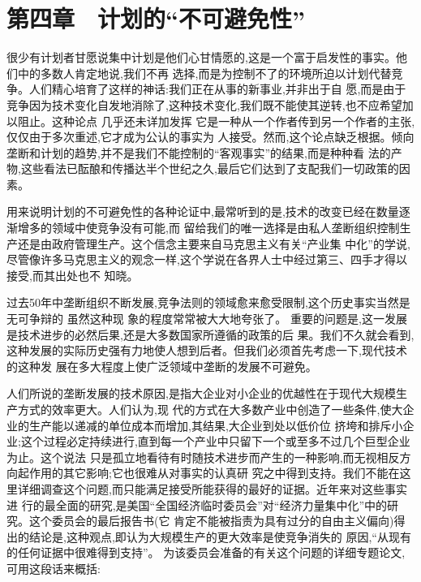 ﻿\documentclass[12pt]{article}
\begin{document}
\section{第四章　计划的``不可避免性''}


很少有计划者甘愿说集中计划是他们心甘情愿的,这是一个富于启发性的事实。他们中的多数人肯定地说,我们不再
选择,而是为控制不了的环境所迫以计划代替竞争。人们精心培育了这样的神话:我们正在从事的新事业,并非出于自
愿,而是由于竞争因为技术变化自发地消除了,这种技术变化,我们既不能使其逆转,也不应希望加以阻止。这种论点
几乎还未详加发挥 \myrule 它是一种从一个作者传到另一个作者的主张,仅仅由于多次重述,它才成为公认的事实为
人接受。然而,这个论点缺乏根据。倾向垄断和计划的趋势,并不是我们不能控制的``客观事实''的结果,而是种种看
法的产物,这些看法已酝酿和传播达半个世纪之久,最后它们达到了支配我们一切政策的因素。

用来说明计划的不可避免性的各种论证中,最常听到的是,技术的改变已经在数量逐渐增多的领域中使竞争没有可能,而
留给我们的唯一选择是由私人垄断组织控制生产还是由政府管理生产。这个信念主要来自马克思主义有关``产业集
中化''的学说,尽管像许多马克思主义的观念一样,这个学说在各界人士中经过第三、四手才得以接受,而其出处也不
知晓。

过去50年中垄断组织不断发展,竞争法则的领域愈来愈受限制,这个历史事实当然是无可争辩的 \myrule 虽然这种现
象的程度常常被大大地夸张了。 重要的问题是,这一发展是技术进步的必然后果,还是大多数国家所遵循的政策的后
果。我们不久就会看到,这种发展的实际历史强有力地使人想到后者。但我们必须首先考虑一下,现代技术的这种发
展在多大程度上使广泛领域中垄断的发展不可避免。

人们所说的垄断发展的技术原因,是指大企业对小企业的优越性在于现代大规模生产方式的效率更大。人们认为,现
代的方式在大多数产业中创造了一些条件,使大企业的生产能以递减的单位成本而增加,其结果,大企业到处以低价位
挤垮和排斥小企业;这个过程必定持续进行,直到每一个产业中只留下一个或至多不过几个巨型企业为止。这个说法
只是孤立地看待有时随技术进步而产生的一种影响,而无视相反方向起作用的其它影响;它也很难从对事实的认真研
究之中得到支持。我们不能在这里详细调查这个问题,而只能满足接受所能获得的最好的证据。近年来对这些事实进
行的最全面的研究,是美国``全国经济临时委员会''对``经济力量集中化''中的研究。这个委员会的最后报告书(它
肯定不能被指责为具有过分的自由主义偏向)得出的结论是,这种观点,即认为大规模生产的更大效率是使竞争消失的
原因,``从现有的任何证据中很难得到支持''。 为该委员会准备的有关这个问题的详细专题论文,可用这段话来概括:
\end{document}
